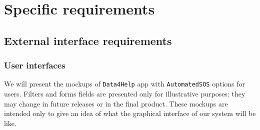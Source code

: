 \newcommand{\fetchmock}[1] {img/mockup/#1.jpg}
\def \imgwidth {.6\linewidth}
\def \pagwidth {.5\linewidth}
\newcommand{\uclist}[1] {
  \setlist{nolistsep}
  \begin{enumerate}[noitemsep]
    #1
  \end{enumerate}
}
\newcommand{\usecase}[9] {
  \begin{table}[h!]
  \centering
    \begin{tabularx}{\linewidth}{|c|X|}
      \hline
      \textbf{ID}               & \texttt{UC.#1} \\ \hline
      \textbf{Name}             & #2 \\ \hline
      \textbf{Actors}           & #3 \\ \hline
      \textbf{Entry Condition}  & #4 \\ \hline
      \textbf{Flow of Events}   & #5 \\ \hline
      \textbf{Exit Condition}   & #6 \\ \hline
      \textbf{Exceptions}       & #7 \\ \hline
      \textbf{Special Requirements}  & #8\\ \hline
    \end{tabularx}
    \caption*{#9}
    \label{tab:uc#1}
  \end{table}
}

\section{Specific requirements}
\label{sec:specreq}

  \subsection{External interface requirements}

    \subsubsection{User interfaces}
    \label{sec:userinterfaces}

      We will present the mockups of \texttt{Data4Help} app with \texttt{AutomatedSOS} options for users. Filters and forms fields are presented only for illustrative purposes: they may change in future releases or in the final product. These mockups are intended only to give an idea of what the graphical interface of our system will be like.

